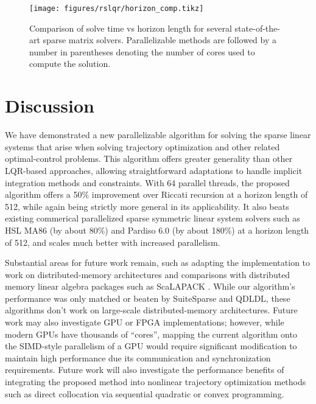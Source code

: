 \documentclass[../root.tex]{subfiles}
\newcommand{\0}{{\transparent{0} \resizebox{\mycellheight}{\mycellheight}{0}}}
\begin{document}
\begin{figure}
    \centering 
    \texttt{[image: figures/rslqr/horizon\_comp.tikz]}
    \caption{Comparison of solve time vs horizon length for several state-of-the-art 
    sparse matrix solvers. Parallelizable methods are followed by a number in parentheses 
    denoting the number of cores used to compute the solution. }
    \label{fig:horizon_comp}
\end{figure}

\section{Discussion} \label{sec:conclusion}

We have demonstrated a new parallelizable algorithm for solving the sparse
linear systems that arise when solving trajectory optimization and other related
optimal-control problems.  This algorithm offers greater generality than other
LQR-based approaches, allowing straightforward adaptations to handle implicit
integration methods and constraints. With 64 parallel threads, the proposed
algorithm offers a 50\% improvement over Riccati recursion at a horizon length
of 512, while again being strictly more general in its applicability. It also
beats existing commerical parallelized sparse symmetric linear system solvers
such as HSL MA86 (by about 80\%) and Pardiso 6.0 (by about 180\%) at a horizon
length of 512, and scales much better with increased parallelism. 

Substantial areas for future work remain, such as adapting the implementation to work on
distributed-memory architectures and comparisons with distributed memory linear algebra
packages such as ScaLAPACK \cite{tennessee_ScaLAPACK_}. While our algorithm's performance was only
matched or beaten by SuiteSparse and QDLDL, these algorithms don't work on large-scale
distributed-memory architectures.  Future work may also investigate GPU or FPGA 
implementations; however, while modern GPUs have thousands of ``cores'', mapping the current
algorithm onto the SIMD-style parallelism of a GPU would require significant modification to maintain high performance due its communication and
synchronization requirements.  Future work will also investigate the performance benefits of
integrating the proposed method into nonlinear trajectory optimization methods such as 
direct collocation via sequential quadratic or convex programming. %

\end{document}
